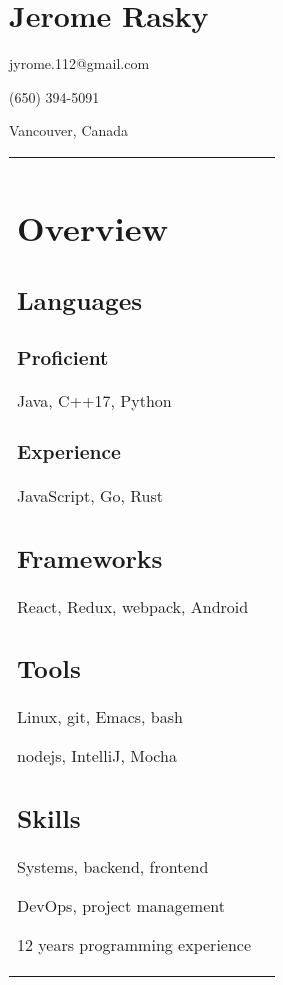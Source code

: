 \documentclass[letterpaper]{article}
\newlength{\leftcol}
\newlength{\rightcol}
\begin{document}
\sffamily
\large
{}

\section*{\Huge Jerome Rasky}

jyrome.112@gmail.com

(650) 394-5091

Vancouver, Canada

\begin{tabularx}{\textwidth}{@{}p{\leftcol} p{\rightcol}}
\section*{Overview}
\subsection*{Languages}

\subsubsection*{Proficient}

Java, C++17, Python

\subsubsection*{Experience}

JavaScript, Go, Rust

\subsection*{Frameworks}

React, Redux, webpack, Android

\subsection*{Tools}

Linux, git, Emacs, bash

nodejs, IntelliJ, Mocha

\subsection*{Skills}

Systems, backend, frontend

DevOps, project management

12 years programming experience


\end{tabularx}
\end{document}
